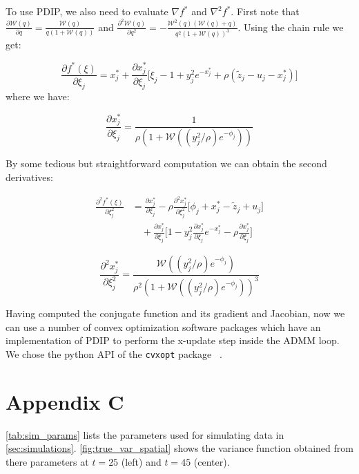 \documentclass{article}
\begin{document}
To use PDIP, we also need to evaluate $\nabla f^*$ and $\nabla^2 f^*$. First note that $\frac{\partial \mathscr{W}(q)}{\partial q} = \frac{\mathscr{W}(q)}{q(1+\mathscr{W}(q))}$ and $\frac{\partial^2 \mathscr{W}(q)}{\partial q^2} = - \frac{\mathscr{W}^2(q)(\mathscr{W}(q)+q)}{q^2(1+\mathscr{W}(q))^3}$. Using the chain rule we get:


\begin{equation}
\frac{\partial f^*(\xi)}{\partial \xi_j}  =  x^*_j  + \frac{\partial x^*_j}{\partial \xi_j} \bigg[ \xi_j -1 + y_j^2 e^{-x_j^*} + \rho (\tilde{z}_j - u_j - x_j^*) \bigg]
\label{eq:d_f*_start}
\end{equation}
where we have:

\begin{equation}
\frac{\partial x_j^*}{\partial \xi_j}  = \frac{1}{\rho(1+\mathscr{W}((y_j^2/\rho) e^{-\phi_j} ))}
\label{eq:d_x*_start}
\end{equation}

By some tedious but straightforward computation we can obtain the second derivatives:


\begin{align}
\frac{\partial^2 f^*(\xi)}{\partial \xi_j^2} & =  \frac{\partial x_j^*}{\partial \xi_j} - \rho \frac{\partial^2 x_j^*}{\partial \xi_j^2} \bigg[ \phi_j +x_j^* - \tilde{z}_j + u_j \bigg]\\
& \quad + \frac{\partial x_j^*}{\partial \xi_j} \bigg[ 1-y_j^2 \frac{\partial x_j^*}{\partial \xi_j} e^{-x_j^*} -\rho \frac{\partial x_j^*}{\partial \xi_j} \bigg]
\label{eq:d2_f*_start}
\end{align}


\begin{equation}
\frac{\partial^2 x_j^*}{\partial \xi_j^2}  = \frac{\mathscr{W}((y_j^2/\rho) e^{-\phi_j} )}{\rho^2(1+\mathscr{W}((y_j^2/\rho) e^{-\phi_j} ))^3}
\label{eq:d2_x*_start}
\end{equation}

Having computed the conjugate function and its gradient and Jacobian, now we can use a number of convex optimization software packages which have an implementation of PDIP to perform the x-update step inside the ADMM loop. We chose the python API of the \texttt{cvxopt} package ~\citep{andersen_cvxopt:_2013}. 

\section{Appendix C}
\autoref{tab:sim_params} lists the parameters used for simulating data
in \autoref{sec:simulations}. \autoref{fig:true_var_spatial} shows the
variance function obtained from there parameters at $t=25$ (left) and
$t=45$ (center). 
\end{document}
